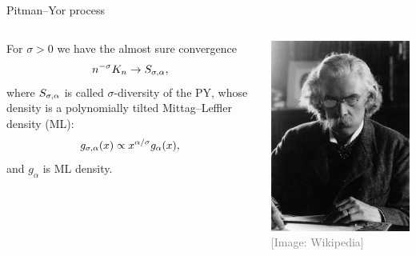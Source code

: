 \begin{frame}[allowframebreaks]{Pitman--Yor process}
\begin{columns}
\begin{proposition}
For $\sigma >0$ we have the almost sure convergence 
$$
n^{-\sigma}K_n\rightarrow S_{\sigma, \alpha},
$$
where $ S_{\sigma, \alpha}$ is called $\sigma$-diversity of the PY, whose density is a polynomially tilted \alert{Mittag--Leffler density} (ML):
\begin{equation*}
    g_{\sigma,\alpha}(x)\propto x^{\alpha/\sigma}g_\alpha (x),
\end{equation*}
and $g_\alpha$ is ML density.
\end{proposition}
\includegraphics[width=\textwidth]{figures_julyan/trombi/Mittag-Leffler}
		\hfill\textcolor{gray}{[Image: Wikipedia]}
\end{columns}




\framebreak


\end{frame}
